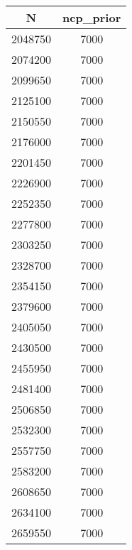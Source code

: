 \documentclass[10pt,a4paper]{report}
\begin{document}
\begin{tabular}{|c|c|}
\hline
N & ncp\_prior \\
\hline
2048750 & 7000 \\
\hline
2074200 & 7000 \\
\hline
2099650 & 7000 \\
\hline
2125100 & 7000 \\
\hline
2150550 & 7000 \\
\hline
2176000 & 7000 \\
\hline
2201450 & 7000 \\
\hline
2226900 & 7000 \\
\hline
2252350 & 7000 \\
\hline
2277800 & 7000 \\
\hline
2303250 & 7000 \\
\hline
2328700 & 7000 \\
\hline
2354150 & 7000 \\
\hline
2379600 & 7000 \\
\hline
2405050 & 7000 \\
\hline
2430500 & 7000 \\
\hline
2455950 & 7000 \\
\hline
2481400 & 7000 \\
\hline
2506850 & 7000 \\
\hline
2532300 & 7000 \\
\hline
2557750 & 7000 \\
\hline
2583200 & 7000 \\
\hline
2608650 & 7000 \\
\hline
2634100 & 7000 \\
\hline
2659550 & 7000 \\
\hline 
\end{tabular} 
\end{document}
